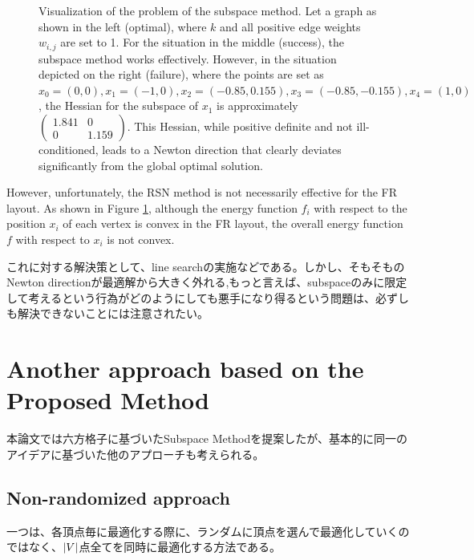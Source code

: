 \documentclass[dvipdfmx,lettersize,journal]{IEEEtran}
\begin{document}
\begin{figure}[t]
  \caption{
    Visualization of the problem of the subspace method.
    Let a graph as shown in the left (optimal), where $k$ and all positive edge weights $w_{i,j}$ are set to 1.
    For the situation in the middle (success), the subspace method works effectively.
    However, in the situation depicted on the right (failure),
    where the points are set as $x_0=(0,0), x_1=(-1,0), x_2=(-0.85,0.155), x_3=(-0.85,-0.155), x_4=(1,0)$,
    the Hessian for the subspace of $x_1$ is approximately
    $
      \begin{pmatrix} 1.841 & 0 \\ 0 & 1.159 \end{pmatrix}
    $.
    This Hessian, while positive definite and not ill-conditioned, leads to a Newton direction that clearly deviates significantly from the global optimal solution.
  }
  \label{fig:why_RSN_failed}
\end{figure}

However, unfortunately, the RSN method is not necessarily effective for the FR layout.
As shown in Figure \ref{fig:why_RSN_failed}, although the energy function \( f_i \) with respect to the position \( x_i \) of each vertex is convex in the FR layout, the overall energy function \( f \) with respect to \( x_i \) is not convex.

これに対する解決策として、line searchの実施などである。しかし、そもそものNewton directionが最適解から大きく外れる,もっと言えば、subspaceのみに限定して考えるという行為がどのようにしても悪手になり得るという問題は、必ずしも解決できないことには注意されたい。

\section{Another approach based on the Proposed Method}\label{sec:anotherApproach}

本論文では六方格子に基づいたSubspace Methodを提案したが、基本的に同一のアイデアに基づいた他のアプローチも考えられる。

\subsection{Non-randomized approach}\label{ssec:nonRandom}
一つは、各頂点毎に最適化する際に、ランダムに頂点を選んで最適化していくのではなく、$\abs{V}$点全てを同時に最適化する方法である。
\end{document}
